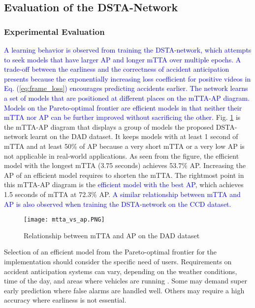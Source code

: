 \documentclass[journal]{IEEEtran}
\begin{document}
\subsection{Evaluation of the DSTA-Network}
\label{sub:performance_evaluation}
\subsubsection{Experimental Evaluation}
\label{sub:exp_evaluation}
\textcolor{blue}{A learning behavior is observed from training the DSTA-network, which attempts to seek models that have larger AP and longer mTTA over multiple epochs. A trade-off between the earliness and the correctness of accident anticipation presents because the exponentially increasing loss coefficient for positive videos in Eq. (\ref{eq:frame_loss}) encourages predicting accidents earlier. The network learns a set of models that are positioned at different places on the mTTA-AP diagram. Models on the Pareto-optimal frontier \cite{censor1977pareto} are efficient models in that neither their mTTA nor AP can be further improved without sacrificing the other.} Fig. \ref{fig_mtta_ap} is the mTTA-AP diagram that displays a group of models the proposed DSTA-network learnt on the DAD dataset. It keeps models with at least 1 second of mTTA and at least 50\% of AP because a very short mTTA or a very low AP is not applicable in real-world applications. As seen from the figure, the efficient model with the longest mTTA (3.75 seconds) achieves 53.7\% AP.  Increasing the AP of an efficient model requires to shorten the mTTA. The rightmost point in this mTTA-AP diagram is the \textcolor{blue}{efficient model with the best AP}, which achieves 1.5 seconds of mTTA at 72.3\% AP. \textcolor{blue}{A similar relationship between mTTA and AP is also observed when training the DSTA-network on the CCD dataset.}

\begin{figure}[htbp]
\centering
\texttt{[image: mtta\_vs\_ap.PNG]}
\caption{Relationship between mTTA and AP on the DAD dataset}
\label{fig_mtta_ap}
\end{figure}


Selection of an efficient model from the Pareto-optimal frontier for the implementation should consider the specific need of users. Requirements on accident anticipation systems can vary, depending on the weather conditions, time of the day, and areas where vehicles are running \cite{li2021crash}. Some may demand super early prediction where false alarms are handled well. Others may require a high accuracy where earliness is not essential.
\end{document}
